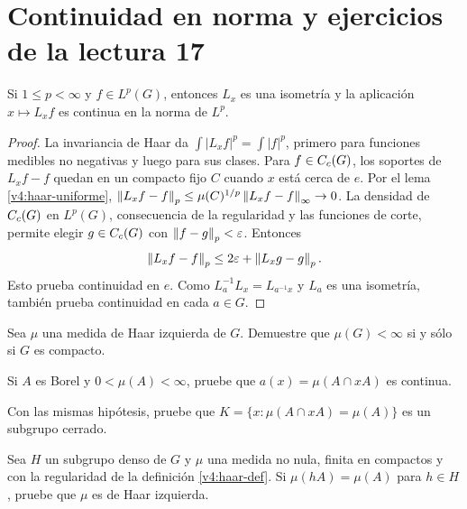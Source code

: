 \section{Continuidad en norma y ejercicios de la lectura 17}
\begin{proposicion}\label{v4:haar-Lp}
Si $1\leq p<\infty$ y $f\in L^p(G)$, entonces $L_x$ es una isometría y la aplicación $x\mapsto L_xf$ es continua en la norma de $L^p$.
\end{proposicion}
\begin{proof}
La invariancia de Haar da $\int|L_xf|^p=\int|f|^p$, primero para funciones medibles no negativas y luego para sus clases. Para $f\in C_c(G)$, los soportes de $L_xf-f$ quedan en un compacto fijo $C$ cuando $x$ está cerca de $e$. Por el lema \ref{v4:haar-uniforme},
$\left\lVert L_xf-f\right\rVert_p\leq\mu(C)^{1/p}\left\lVert L_xf-f\right\rVert_\infty\to0$.
La densidad de $C_c(G)$ en $L^p(G)$, consecuencia de la regularidad y las funciones de corte, permite elegir $g\in C_c(G)$ con $\left\lVert f-g\right\rVert_p<\varepsilon$. Entonces
\[
 \left\lVert L_xf-f\right\rVert_p\leq2\varepsilon+\left\lVert L_xg-g\right\rVert_p.
\]
Esto prueba continuidad en $e$. Como $L_a^{-1}L_x=L_{a^{-1}x}$ y $L_a$ es una isometría, también prueba continuidad en cada $a\in G$.
\end{proof}

\begin{ejercicio}\label{ej:v4-l17-1}
Sea $\mu$ una medida de Haar izquierda de $G$. Demuestre que $\mu(G)<\infty$ si y sólo si $G$ es compacto.
\end{ejercicio}


\begin{ejercicio}\label{ej:v4-l17-2}
Si $A$ es Borel y $0<\mu(A)<\infty$, pruebe que $a(x)=\mu(A\cap xA)$ es continua.
\end{ejercicio}


\begin{ejercicio}\label{ej:v4-l17-3}
Con las mismas hipótesis, pruebe que $K=\{x:\mu(A\cap xA)=\mu(A)\}$ es un subgrupo cerrado.
\end{ejercicio}


\begin{ejercicio}\label{ej:v4-l17-4}
Sea $H$ un subgrupo denso de $G$ y $\mu$ una medida no nula, finita en compactos y con la regularidad de la definición \ref{v4:haar-def}. Si $\mu(hA)=\mu(A)$ para $h\in H$, pruebe que $\mu$ es de Haar izquierda.
\end{ejercicio}
